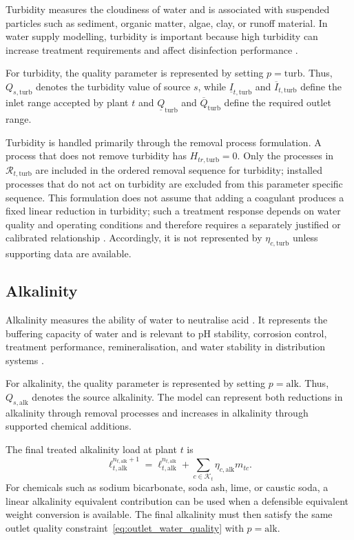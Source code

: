 \documentclass[10pt]{article}
\begin{document}
Turbidity measures the cloudiness of water and is associated with suspended particles such as sediment, organic matter, algae, clay, or runoff material.
In water supply modelling, turbidity is important because high turbidity can increase treatment requirements and affect disinfection performance \cite{WHOTurbidity2011, Matos2024Turbidity, UMNTurbidity}.

For turbidity, the quality parameter is represented by setting $p=\mathrm{turb}$.
Thus, $Q_{s,\mathrm{turb}}$ denotes the turbidity value of source $s$, while
$\underline{I}_{t,\mathrm{turb}}$ and $\overline{I}_{t,\mathrm{turb}}$ define the inlet range accepted by plant $t$ and
$\underline{Q}_{\mathrm{turb}}$ and $\overline{Q}_{\mathrm{turb}}$ define the required outlet range.

Turbidity is handled primarily through the removal process formulation.
A process that does not remove turbidity has $H_{tr,\mathrm{turb}}=0$.
Only the processes in $\mathcal{R}_{t,\mathrm{turb}}$ are included in the ordered removal sequence for turbidity; installed processes that do not act on turbidity are excluded from this parameter specific sequence. This formulation does not assume that adding a coagulant produces a fixed linear reduction in turbidity; such a treatment response depends on water quality and operating conditions and therefore requires a separately justified or calibrated relationship \cite{Huang2025CoagulantDosing}. Accordingly, it is not represented by $\eta_{c,\mathrm{turb}}$ unless supporting data are available.

\subsection{Alkalinity}

Alkalinity measures the ability of water to neutralise acid \cite{ADWG2011, TestNeeds2025Alkalinity, PerfectWater2025Alkalinity}.
It represents the buffering capacity of water and is relevant to pH stability, corrosion control, treatment performance, remineralisation, and water stability in distribution systems \cite{ADWG2011, PerfectWater2025Alkalinity}.

For alkalinity, the quality parameter is represented by setting $p=\mathrm{alk}$.
Thus, $Q_{s,\mathrm{alk}}$ denotes the source alkalinity.
The model can represent both reductions in alkalinity through removal processes and increases in alkalinity through supported chemical additions.

The final treated alkalinity load at plant $t$ is
\begin{equation}\label{eq:alkalinity_post_treatment}
    \ell^{n_{t,\mathrm{alk}}+1}_{t,\mathrm{alk}}
    =
    \ell^{n_{t,\mathrm{alk}}}_{t,\mathrm{alk}}
    +
    \sum_{c \in \mathcal{K}_t}
    \eta_{c,\mathrm{alk}}m_{tc}.
\end{equation}
For chemicals such as sodium bicarbonate, soda ash, lime, or caustic soda, a linear alkalinity equivalent contribution can be used when a defensible equivalent weight conversion is available.
The final alkalinity must then satisfy the same outlet quality constraint~\eqref{eq:outlet_water_quality} with $p=\mathrm{alk}$.
\end{document}
